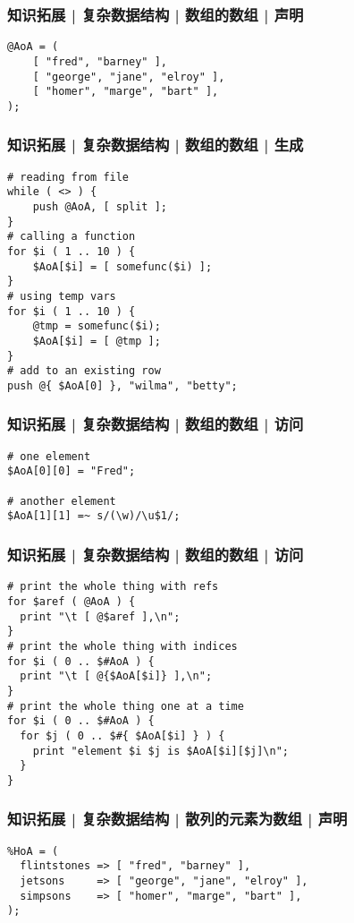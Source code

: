 \begin{frame}[fragile]
  \frametitle{知识拓展 | 复杂数据结构 | 数组的数组 | 声明}
\begin{lstlisting}
@AoA = (
    [ "fred", "barney" ],
    [ "george", "jane", "elroy" ],
    [ "homer", "marge", "bart" ],
);
\end{lstlisting}
\end{frame}

\begin{frame}[fragile]
  \frametitle{知识拓展 | 复杂数据结构 | 数组的数组 | 生成}
\begin{lstlisting}
# reading from file
while ( <> ) {
    push @AoA, [ split ];
}
# calling a function
for $i ( 1 .. 10 ) {
    $AoA[$i] = [ somefunc($i) ];
}
# using temp vars
for $i ( 1 .. 10 ) {
    @tmp = somefunc($i);
    $AoA[$i] = [ @tmp ];
}
# add to an existing row
push @{ $AoA[0] }, "wilma", "betty";
\end{lstlisting}
\end{frame}

\begin{frame}[fragile]
  \frametitle{知识拓展 | 复杂数据结构 | 数组的数组 | 访问}
\begin{lstlisting}
# one element
$AoA[0][0] = "Fred";

# another element
$AoA[1][1] =~ s/(\w)/\u$1/;
\end{lstlisting}
\end{frame}

\begin{frame}[fragile]
  \frametitle{知识拓展 | 复杂数据结构 | 数组的数组 | 访问}
\begin{lstlisting}
# print the whole thing with refs
for $aref ( @AoA ) {
  print "\t [ @$aref ],\n";
}
# print the whole thing with indices
for $i ( 0 .. $#AoA ) {
  print "\t [ @{$AoA[$i]} ],\n";
}
# print the whole thing one at a time
for $i ( 0 .. $#AoA ) {
  for $j ( 0 .. $#{ $AoA[$i] } ) {
    print "element $i $j is $AoA[$i][$j]\n";
  }
}
\end{lstlisting}
\end{frame}

\begin{frame}[fragile]
  \frametitle{知识拓展 | 复杂数据结构 | 散列的元素为数组 | 声明}
\begin{lstlisting}
%HoA = (
  flintstones => [ "fred", "barney" ],
  jetsons     => [ "george", "jane", "elroy" ],
  simpsons    => [ "homer", "marge", "bart" ],
);
\end{lstlisting}
\end{frame}

